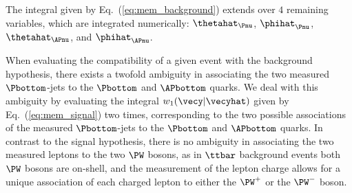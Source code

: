 The integral given by Eq.~(\ref{eq:mem_background}) extends over $4$ remaining variables,
which are integrated numerically: $\thetahat_{\Pnu}$, $\phihat_{\Pnu}$, $\thetahat_{\APnu}$, and $\phihat_{\APnu}$.

When evaluating the compatibility of a given event with the background hypothesis,
there exists a twofold ambiguity in associating the two measured $\Pbottom$-jets to the $\Pbottom$ and $\APbottom$ quarks.
We deal with this ambiguity by evaluating the integral $w_{1}(\vecy|\vecyhat)$ given by Eq.~(\ref{eq:mem_signal}) two times,
corresponding to the two possible associations of the measured $\Pbottom$-jets to the $\Pbottom$ and $\APbottom$ quarks.
In contrast to the signal hypothesis,
there is no ambiguity in associating the two measured leptons to the two $\PW$ bosons,
as in $\ttbar$ background events both $\PW$ bosons are on-shell,
and the measurement of the lepton charge allows for a unique association of each charged lepton to either the $\PW^{+}$ or the $\PW^{-}$ boson.
